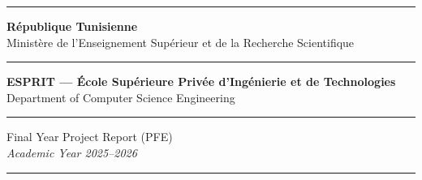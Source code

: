 \documentclass[12pt,a4paper]{report}
\begin{document}
\dominitoc

\begin{titlepage}
\thispagestyle{empty}
\begin{center}

\textcolor{espritblue}{\rule{\linewidth}{3pt}}
\vspace{0.3cm}

{\large\textbf{République Tunisienne}}\\[0.1cm]
{\large Ministère de l'Enseignement Supérieur et de la Recherche Scientifique}\\[0.3cm]

\textcolor{espritblue}{\rule{\linewidth}{1pt}}
\vspace{0.4cm}

\begin{minipage}{0.45\textwidth}
  \centering
\end{minipage}
\hfill
\begin{minipage}{0.45\textwidth}
  \centering
\end{minipage}

\vspace{0.5cm}
{\large\textbf{ESPRIT --- École Supérieure Privée d'Ingénierie et de Technologies}}\\[0.1cm]
{\normalsize Department of Computer Science Engineering}

\vspace{0.6cm}
\textcolor{espritblue}{\rule{0.6\linewidth}{1.5pt}}
\vspace{0.4cm}

{\large Final Year Project Report (PFE)}\\[0.3cm]
{\large\textit{Academic Year 2025--2026}}

\vspace{0.6cm}
\textcolor{espritblue}{\rule{\linewidth}{2pt}}
\vspace{0.3cm}


\end{center}
\end{titlepage}
\end{document}
